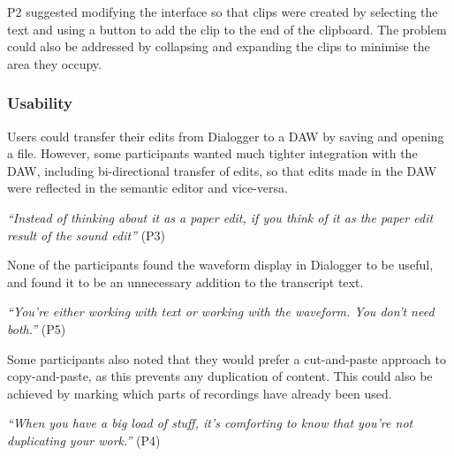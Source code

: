 P2 suggested modifying the interface so that clips were created by selecting the text and using a button to add the
clip to the end of the clipboard. The problem could also be addressed by collapsing and expanding the clips to minimise
the area they occupy.


\subsubsection{Usability}

Users could transfer their edits from Dialogger to a DAW by saving and opening a file. However, some
participants wanted much tighter integration with the DAW, including bi-directional transfer of edits, so that edits
made in the DAW were reflected in the semantic editor and vice-versa.

\textit{``Instead of thinking about it as a paper edit, if you think of it as the paper edit result of the sound
  edit''} (P3)

None of the participants found the waveform display in Dialogger to be useful, and found it to be an
unnecessary addition to the transcript text.

\textit{``You're either working with text or working with the waveform. You don't need both.''} (P5)

Some participants also noted that they would prefer a cut-and-paste approach to copy-and-paste, as this prevents any
duplication of content. This could also be achieved by marking which parts of recordings have already been used.

\textit{``When you have a big load of stuff, it's comforting to know that you're not duplicating your work.''} (P4)



